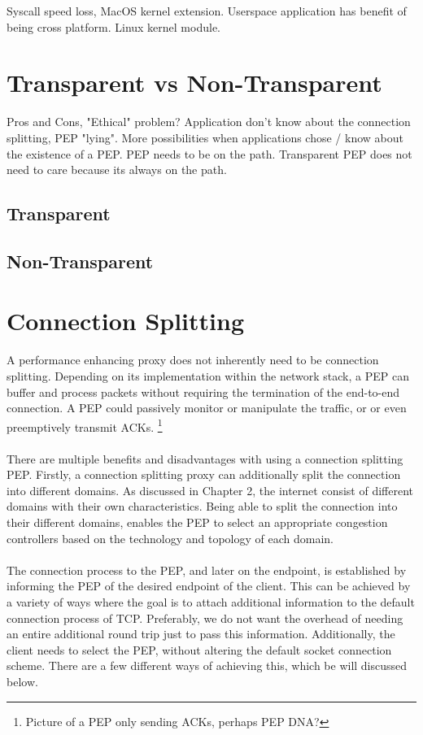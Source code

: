 \documentclass[a4paper,english, 11pt]{report}
\begin{document}
Syscall speed loss, MacOS kernel extension. Userspace application has benefit of being cross platform.
Linux kernel module.


\section{Transparent vs Non-Transparent}
Pros and Cons,
"Ethical" problem? Application don't know about the connection splitting, PEP "lying".
More possibilities when applications chose / know about the existence of a PEP.
PEP needs to be on the path. Transparent PEP does not need to care because its always on the path.

\subsection{Transparent}

\subsection{Non-Transparent}

\section{Connection Splitting}
A performance enhancing proxy does not inherently need to be connection splitting. Depending on its implementation within the network stack, a PEP can buffer and process packets without requiring the termination of the end-to-end connection. A PEP could passively monitor or manipulate the traffic, or or even preemptively transmit ACKs.
\footnote{Picture of a PEP only sending ACKs, perhaps PEP DNA?}\\
\\
There are multiple benefits and disadvantages with using a connection splitting PEP. Firstly, a connection splitting proxy can additionally split the connection into different domains. As discussed in Chapter 2, the internet consist of different domains with their own characteristics. Being able to split the connection into their different domains, enables the PEP to select an appropriate congestion controllers based on the technology and topology of each domain.\\
\\
The connection process to the PEP, and later on the endpoint, is established by informing the PEP of the desired endpoint of the client. This can be achieved by a variety of ways where the goal is to attach additional information to the default connection process of TCP. Preferably, we do not want the overhead of needing an entire additional round trip just to pass this information. Additionally, the client needs to select the PEP, without altering the default socket connection scheme. There are a few different ways of achieving this, which be will discussed below.
\end{document}
